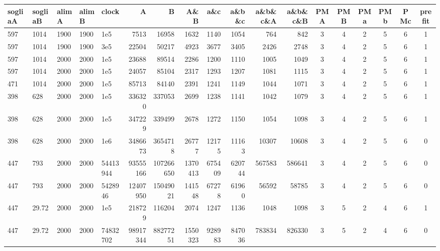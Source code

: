 
\begin{landscape}
	\begin{table}
		\centering
		\small
		\begin{tabular}{llll|lrrrrrrr|ccccc|c}
			sogliaA & sogliaB & alimA & alimB & clock & A & B & A\&B & a\&c & a\&b\&c & a\&b\&c\&A & a\&b\&c\&B & PMA & PMB & PMa & PMb & PMc & prefit \\
			\hline\hline
			597 & 1014 & 1900 & 1900 & 1e5 & 7513 & 16958 & 1632 & 1140 & 1054 & 764 & 842 & 3 & 4 & 2 & 5 & 6 & 1                          \\
			597 & 1014 & 1900 & 1900 & 3e5 & 22504 & 50217 & 4923 & 3677 & 3405 & 2426 & 2748 & 3 & 4 & 2 & 5 & 6 & 1                       \\
			597 & 1014 & 2000 & 2000 & 1e5 & 23688 & 89514 & 2286 & 1200 & 1110 & 1005 & 1049 & 3 & 4 & 2 & 5 & 6 & 1                       \\
			597 & 1014 & 2000 & 2000 & 1e5 & 24057 & 85104 & 2317 & 1293 & 1207 & 1081 & 1115 & 3 & 4 & 2 & 5 & 6 & 1                       \\
			471 & 1014 & 2000 & 2000 & 1e5 & 85713 & 84140 & 2391 & 1241 & 1149 & 1044 & 1071 & 3 & 4 & 2 & 5 & 6 & 1                       \\
			398 & 628 & 2000 & 2000 & 1e5 & 336320 & 337053 & 2699 & 1238 & 1141 & 1042 & 1079 & 3 & 4 & 2 & 5 & 6 & 1                      \\
			398 & 628 & 2000 & 2000 & 1e5 & 347229 & 339499 & 2678 & 1272 & 1150 & 1054 & 1098 & 3 & 4 & 2 & 5 & 6 & 1                      \\
			398 & 628 & 2000 & 2000 & 1e6 & 3486673 & 3654718 & 26777 & 12175 & 11163 & 10307 & 10608 & 3 & 4 & 2 & 5 & 6 & 0               \\
			447 & 793 & 2000 & 2000 & 54413944 & 93555166 & 107266650 & 1370413 & 675409 & 620744 & 567583 & 586641 & 3 & 4 & 2 & 5 & 6 & 0 \\
			447 & 793 & 2000 & 2000 & 5428946 & 12407950 & 15049021 & 141548 & 67278 & 61960 & 56592 & 58785 & 3 & 4 & 2 & 5 & 6 & 0        \\
			\hline
			447 & 29.72 & 2000 & 2000 & 1e5 & 218729 & 116204 & 2074 & 1247 & 1136 & 1048 & 1098 & 3 & 5 & 2 & 4 & 6 & 1                       \\
			447 & 29.72 & 2000 & 2000 & 74832702 & 98917344 & 88277251 & 1550323 & 928983 & 847036 & 783834 & 826330 & 3 & 5 & 2 & 4 & 6 & 0   \\

\end{tabular}
\end{table}
\end{landscape}
